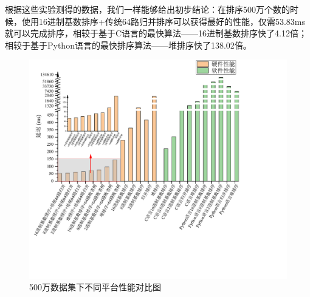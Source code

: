 根据这些实验测得的数据，我们一样能够给出初步结论：在排序500万个数的时候，使用16进制基数排序+传统64路归并排序可以获得最好的性能，仅需53.83ms就可以完成排序，相较于基于C语言的最快算法——16进制基数排序快了4.12倍；相较于基于Python语言的最快排序算法——堆排序快了138.02倍。

\begin{figure}[htbp]
    \centering
    \includegraphics[width=\linewidth]{figures/5MComparison.pdf}
    \caption{500万数据集下不同平台性能对比图}
    \label{fig:5MComparison}
\end{figure}


\begin{table}[htbp]
\centering
\caption{500万级别数据集软件性能测试}
\label{tab:5Msoftware}
\end{table}


